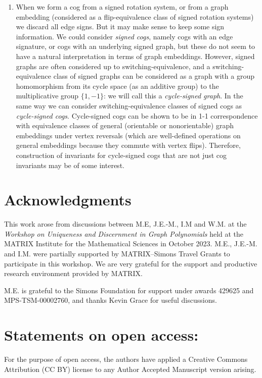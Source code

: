 \documentclass{amsart}
\theoremstyle{definition}
\theoremstyle{remark}
\numberwithin{equation}{section}
\begin{document}
\begin{enumerate}
\item\label{fs.sc}
When we form a cog from a signed rotation system, or from a graph embedding (considered as a flip-equivalence class of signed rotation systems) we discard all edge signs.  But it may make sense to keep some sign information.  We could consider \emph{signed cogs}, namely cogs with an edge signature, or cogs with an underlying signed graph, but these do not seem to have a natural interpretation in terms of graph embeddings.  However, signed graphs are often considered up to switching-equivalence, and a switching-equivalence class of signed graphs can be considered as a graph with a group homomorphism from its cycle space (as an additive group) to the multiplicative group $\{1, -1\}$: we will call this a \emph{cycle-signed graph}.  In the same way we can consider switching-equivalence classes of signed cogs as \emph{cycle-signed cogs}.  Cycle-signed cogs can be shown to be in 1-1 correspondence with equivalence classes of general (orientable or nonorientable) graph embeddings under vertex reversals (which are well-defined operations on general embeddings because they commute with vertex flips).  Therefore, construction of invariants for cycle-signed cogs that are not just cog invariants may be of some interest.


\end{enumerate}


\section*{Acknowledgments}

This work arose from discussions between M.E, J.E.-M., I.M and W.M. at the \emph{Workshop on Uniqueness and Discernment in Graph Polynomials} held at the MATRIX Institute for the Mathematical Sciences in October 2023. M.E., J.E.-M. and I.M. were partially supported by MATRIX--Simons Travel Grants to participate in this workshop.  We are very grateful for the support and productive research environment provided by MATRIX.



M.E. is grateful to the Simons Foundation for support under awards 429625 and MPS-TSM-00002760, and thanks Kevin Grace for useful discussions.


\section*{Statements on open access:}


For the purpose of open access, the authors have applied a Creative Commons
Attribution (CC BY) license to any Author Accepted Manuscript version arising.
\end{document}
